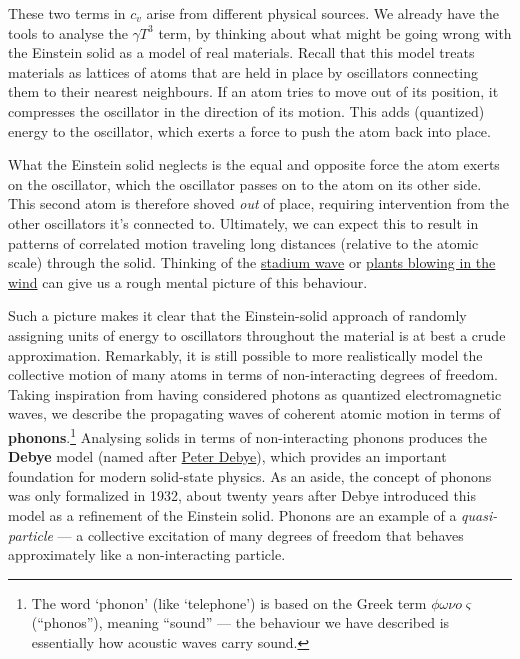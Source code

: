 \documentclass[12 pt]{article} %
\newcommand{\ga}{\ensuremath{\gamma} }
\newcommand{\om}{\ensuremath{\omega} }
\begin{document}
These two terms in $c_v$ arise from different physical sources.
We already have the tools to analyse the $\ga T^3$ term, by thinking about what might be going wrong with the Einstein solid as a model of real materials.
Recall that this model treats materials as lattices of atoms that are held in place by oscillators connecting them to their nearest neighbours.
If an atom tries to move out of its position, it compresses the oscillator in the direction of its motion.
This adds (quantized) energy to the oscillator, which exerts a force to push the atom back into place.

What the Einstein solid neglects is the equal and opposite force the atom exerts on the oscillator, which the oscillator passes on to the atom on its other side.
This second atom is therefore shoved \textit{out} of place, requiring intervention from the other oscillators it's connected to.
Ultimately, we can expect this to result in patterns of correlated motion traveling long distances (relative to the atomic scale) through the solid.
Thinking of the \href{https://en.wikipedia.org/wiki/Wave_(audience)}{stadium wave} or \href{https://www.youtube.com/watch?v=uTlwzsud-zg}{plants blowing in the wind} can give us a rough mental picture of this behaviour.

Such a picture makes it clear that the Einstein-solid approach of randomly assigning units of energy to oscillators throughout the material is at best a crude approximation.
Remarkably, it is still possible to more realistically model the collective motion of many atoms in terms of non-interacting degrees of freedom.
Taking inspiration from having considered photons as quantized electromagnetic waves, we describe the propagating waves of coherent atomic motion in terms of \textbf{phonons}.\footnote{The word `phonon' (like `telephone') is based on the Greek term $\phi \om \nu o \varsigma$ (``phonos''), meaning ``sound'' --- the behaviour we have described is essentially how acoustic waves carry sound.}
Analysing solids in terms of non-interacting phonons produces the \textbf{Debye} model (named after \href{https://en.wikipedia.org/wiki/Peter_Debye}{Peter Debye}), which provides an important foundation for modern solid-state physics.
As an aside, the concept of phonons was only formalized in 1932, about twenty years after Debye introduced this model as a refinement of the Einstein solid.
Phonons are an example of a \textit{quasi-particle} --- a collective excitation of many degrees of freedom that behaves approximately like a non-interacting particle.
\end{document}
